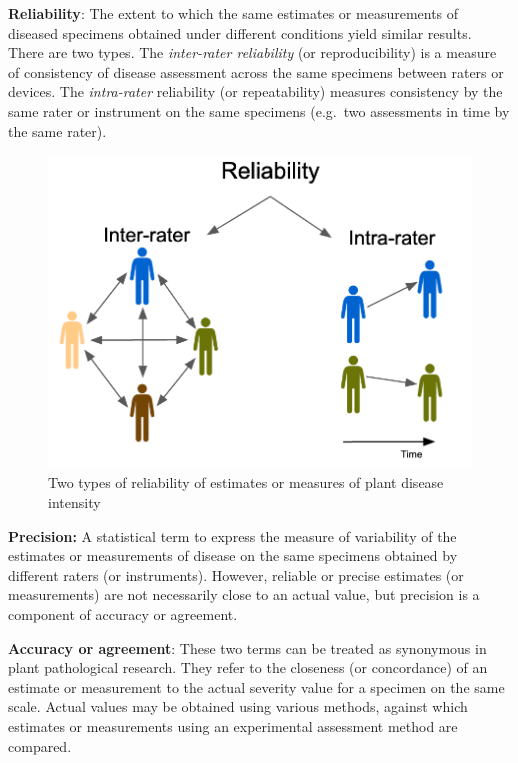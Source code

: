 \documentclass[
  letterpaper,
  DIV=11,
  numbers=noendperiod]{scrreprt}
\begin{document}
\textbf{Reliability}: The extent to which the same estimates or
measurements of diseased specimens obtained under different conditions
yield similar results. There are two types. The \emph{inter-rater
reliability} (or reproducibility) is a measure of consistency of disease
assessment across the same specimens between raters or devices. The
\emph{intra-rater} reliability (or repeatability) measures consistency
by the same rater or instrument on the same specimens (e.g.~two
assessments in time by the same rater).

\begin{figure}

{\centering \includegraphics[width=5.26042in,height=\textheight]{imgs/reliability.png}

}

\caption{\label{fig-reliability.png}Two types of reliability of
estimates or measures of plant disease intensity}

\end{figure}

\textbf{Precision:} A statistical term to express the measure of
variability of the estimates or measurements of disease on the same
specimens obtained by different raters (or instruments). However,
reliable or precise estimates (or measurements) are not necessarily
close to an actual value, but precision is a component of accuracy or
agreement.

\textbf{Accuracy or agreement}: These two terms can be treated as
synonymous in plant pathological research. They refer to the closeness
(or concordance) of an estimate or measurement to the actual severity
value for a specimen on the same scale. Actual values may be obtained
using various methods, against which estimates or measurements using an
experimental assessment method are compared.
\end{document}
